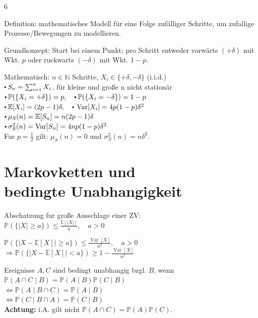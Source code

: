 \documentclass[8pt,a4paper,landscape]{extarticle}
\begin{document}
\begin{multicols*}{6}

{\color{orange}Definition:} mathematisches Modell für eine Folge zufälliger Schritte,   
um zufallige Prozesse/Bewegungen zu modellieren.

{\color{MyBlue}Grundkonzept:} Start bei einem Punkt; pro Schritt entweder vorwärts $(+\delta)$
mit Wkt. $p$ oder ruckwarts $(-\delta)$ mit Wkt. $1-p$.

{\color{orange}Mathematisch:} $n\in\mathbb{N}$ Schritte, $X_i\in\{+\delta,-\delta\}$ (i.i.d.) \\
$\sbullet S_n=\sum_{i=1}^{n}X_i$, für kleine und große n nicht stationär \\
$\sbullet \mathbb{P}(\{X_i=+\delta\})=p,\quad \sbullet \mathbb{P}(\{X_i=-\delta\})=1-p$ \\
$\sbullet \mathbb{E}[X_i]=(2p-1)\delta,\quad \sbullet \operatorname{Var}[X_i]=4p(1-p)\delta^2$ \\
$\sbullet \mu_S(n)=\mathbb{E}[S_n]=n(2p-1)\delta$ \\
$\sbullet \sigma_S^2(n)=\operatorname{Var}[S_n]=4np(1-p)\delta^2$ \\
Fur $p=\frac{1}{2}$ gilt: $\mu_S(n)=0$ und $\sigma_S^2(n)=n\delta^2$.


\section{Markovketten und \\ bedingte Unabhangigkeit}


Abschatzung fur große Ausschlage einer ZV: \\
$\mathbb{P}(\{|X|\ge a\}) \le \frac{\mathbb{E}[|X|]}{a},\quad a>0$


$\mathbb{P}(\{|X-\mathbb{E}[X]|\ge a\}) \le \frac{\operatorname{Var}[X]}{a^2},\quad a>0$ \\
$\Rightarrow \mathbb{P}(\{|X-\mathbb{E}[X]|<a\}) \ge 1-\frac{\operatorname{Var}[X]}{a^2}$


Ereignisse $A,C$ sind bedingt unabhangig bzgl. $B$, wenn \\
$\mathbb{P}(A\cap C\mid B)=\mathbb{P}(A\mid B)\mathbb{P}(C\mid B)$ \\
$\Leftrightarrow \mathbb{P}(A\mid B\cap C)=\mathbb{P}(A\mid B)$ \\
$\Leftrightarrow \mathbb{P}(C\mid B\cap A)=\mathbb{P}(C\mid B)$ \\
\textbf{Achtung:} i.A. gilt nicht $\mathbb{P}(A\cap C)=\mathbb{P}(A)\mathbb{P}(C)$.


\end{multicols*}
\end{document}
